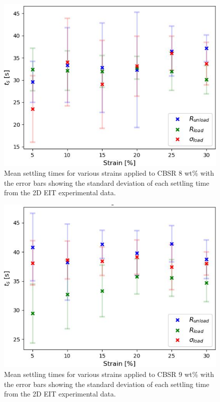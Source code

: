 \begin{figure}[H]
	\centering
	\includegraphics[width=0.8\linewidth]{Figures/CBSR_8p_1_9push_XXstrain_60s_X_ts_vals_vs_strain.jpg}
	\caption{Mean settling times for various strains applied to CBSR 8 wt\% with the error bars showing the standard deviation of each settling time from the 2D EIT experimental data.}
	\label{fig:strain_ts_8p}
\end{figure}
\begin{figure}[H]
	\centering
	\includegraphics[width=0.8\linewidth]{Figures/CBSR_9p_2_9push_XXstrain_60s_1mA_X_ts_vals_vs_strain.jpg}
	\caption{Mean settling times for various strains applied to CBSR 9 wt\% with the error bars showing the standard deviation of each settling time from the 2D EIT experimental data.}
	\label{fig:strain_ts_9p}
\end{figure}


